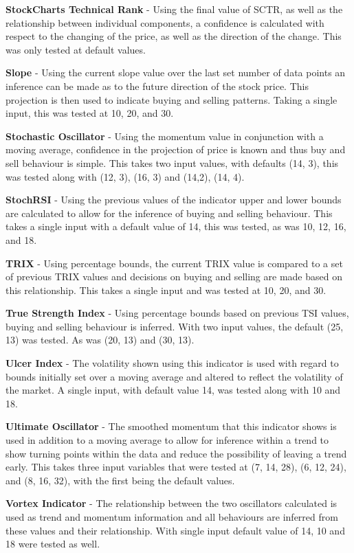 \documentclass[conference]{IEEEtran}
\begin{document}
\textbf{StockCharts Technical Rank} - Using the final value of SCTR, as well as the relationship between individual components, a confidence is calculated with respect to the changing of the price, as well as the direction of the change. This was only tested at default values.

\textbf{Slope} - Using the current slope value over the last set number of data points an inference can be made as to the future direction of the stock price. This projection is then used to indicate buying and selling patterns. Taking a single input, this was tested at 10, 20, and 30.

\textbf{Stochastic Oscillator} - Using the momentum value in conjunction with a moving average, confidence in the projection of price is known and thus buy and sell behaviour is simple. This takes two input values, with defaults (14, 3), this was tested along with (12, 3), (16, 3) and (14,2), (14, 4).

\textbf{StochRSI} - Using the previous values of the indicator upper and lower bounds are calculated to allow for the inference of buying and selling behaviour. This takes a single input with a default value of 14, this was tested, as was 10, 12, 16, and 18.

\textbf{TRIX} - Using percentage bounds, the current TRIX value is compared to a set of previous TRIX values and decisions on buying and selling are made based on this relationship. This takes a single input and was tested at 10, 20, and 30. 

\textbf{True Strength Index} - Using percentage bounds based on previous TSI values, buying and selling behaviour is inferred. With two input values, the default (25, 13) was tested. As was (20, 13) and (30, 13).

\textbf{Ulcer Index} - The volatility shown using this indicator is used with regard to bounds initially set over a moving average and altered to reflect the volatility of the market. A single input, with default value 14, was tested along with 10 and 18.

\textbf{Ultimate Oscillator} - The smoothed momentum that this indicator shows is used in addition to a moving average to allow for inference within a trend to show turning points within the data and reduce the possibility of leaving a trend early. This takes three input variables that were tested at (7, 14, 28), (6, 12, 24), and (8, 16, 32), with the first being the default values.

\textbf{Vortex Indicator} - The relationship between the two oscillators calculated is used as trend and momentum information and all behaviours are inferred from these values and their relationship. With single input default value of 14, 10 and 18 were tested as well.
\end{document}
